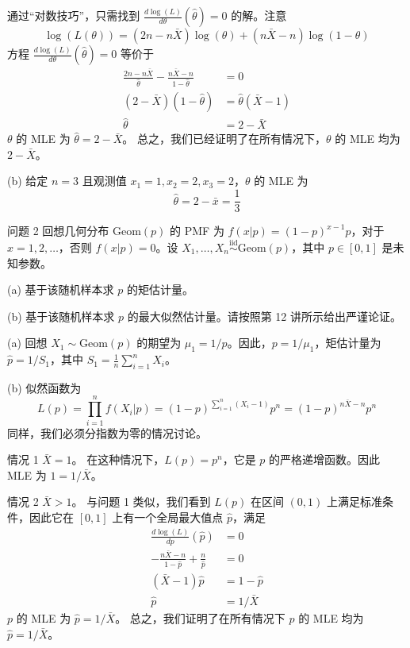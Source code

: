 \begin{questions}
\begin{solution}
通过“对数技巧”，只需找到 $\frac{d\log(L)}{d\theta}(\hat{\theta}) = 0$ 的解。注意
\[
\log(L(\theta)) = (2n - n\bar{X})\log(\theta) + (n\bar{X} - n)\log(1 - \theta)
\]
方程 $\frac{d\log(L)}{d\theta}(\hat{\theta}) = 0$ 等价于
\begin{align*}
\frac{2n - n\bar{X}}{\hat{\theta}} - \frac{n\bar{X} - n}{1 - \hat{\theta}} &= 0 \\
(2 - \bar{X})(1 - \hat{\theta}) &= \hat{\theta}(\bar{X} - 1) \\
\hat{\theta} &= 2 - \bar{X}
\end{align*}
$\theta$ 的 MLE 为 $\hat{\theta} = 2 - \bar{X}$。
总之，我们已经证明了在所有情况下，$\theta$ 的 MLE 均为 $2 - \bar{X}$。

(b) 给定 $n = 3$ 且观测值 $x_1 = 1, x_2 = 2, x_3 = 2$，$\theta$ 的 MLE 为
\[
\hat{\theta} = 2 - \bar{x} = \frac{1}{3}
\]
\end{solution}

\question 问题 2 回想几何分布 $\text{Geom}(p)$ 的 PMF 为 $f(x|p) = (1 - p)^{x-1}p$，对于 $x = 1, 2, \dots$，否则 $f(x|p) = 0$。设 $X_1, \dots, X_n \overset{\text{iid}}{\sim} \text{Geom}(p)$，其中 $p \in [0, 1]$ 是未知参数。

(a) 基于该随机样本求 $p$ 的矩估计量。

(b) 基于该随机样本求 $p$ 的最大似然估计量。请按照第 12 讲所示给出严谨论证。

\begin{solution}
(a) 回想 $X_1 \sim \text{Geom}(p)$ 的期望为 $\mu_1 = 1/p$。因此，$p = 1/\mu_1$，矩估计量为 $\hat{p} = 1/S_1$，其中 $S_1 = \frac{1}{n} \sum_{i=1}^n X_i$。

(b) 似然函数为
\[
L(p) = \prod_{i=1}^n f(X_i|p) = (1 - p)^{\sum_{i=1}^n (X_i-1)} p^n = (1 - p)^{n\bar{X}-n} p^n
\]
同样，我们必须分指数为零的情况讨论。

情况 1 $\bar{X} = 1$。
在这种情况下，$L(p) = p^n$，它是 $p$ 的严格递增函数。因此 MLE 为 $1 = 1/\bar{X}$。

情况 2 $\bar{X} > 1$。
与问题 1 类似，我们看到 $L(p)$ 在区间 $(0, 1)$ 上满足标准条件，因此它在 $[0, 1]$ 上有一个全局最大值点 $\hat{p}$，满足
\begin{align*}
\frac{d\log(L)}{dp}(\hat{p}) &= 0 \\
-\frac{n\bar{X} - n}{1 - \hat{p}} + \frac{n}{\hat{p}} &= 0 \\
(\bar{X} - 1)\hat{p} &= 1 - \hat{p} \\
\hat{p} &= 1/\bar{X}
\end{align*}
$p$ 的 MLE 为 $\hat{p} = 1/\bar{X}$。
总之，我们证明了在所有情况下 $p$ 的 MLE 均为 $\hat{p} = 1/\bar{X}$。
\end{solution}


\end{questions}
